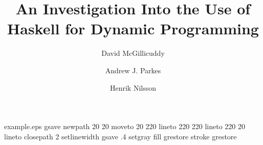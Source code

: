 %
%
%
%
%
\begin{filecontents*}{example.eps}
gsave
newpath
  20 20 moveto
  20 220 lineto
  220 220 lineto
  220 20 lineto
closepath
2 setlinewidth
gsave
  .4 setgray fill
grestore
stroke
grestore
\end{filecontents*}
%
\RequirePackage{fix-cm}
%
\documentclass[smallextended]{svjour3}       %
%
\smartqed  %
%
\usepackage{graphicx}
%
\usepackage{mathptmx}      %
%
\usepackage{epstopdf}
\usepackage{hyperref}
%
%
%


\title{An Investigation Into the Use of Haskell for Dynamic Programming
}


\author{
	David McGillicuddy \and
	Andrew J. Parkes \and
	Henrik Nilsson
}


